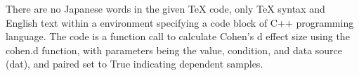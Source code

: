 There are no Japanese words in the given TeX code, only TeX syntax and English text within a \lstlisting environment specifying a code block of C++ programming language. The code is a function call to calculate Cohen's d effect size using the cohen.d function, with parameters being the value, condition, and data source (dat), and paired set to True indicating dependent samples.
